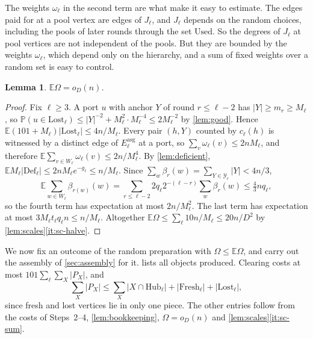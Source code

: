 \documentclass[11pt]{article}
\newtheorem{lemma}[theorem]{Lemma}
\theoremstyle{definition}
\theoremstyle{remark}
\numberwithin{equation}{section}
\numberwithin{figure}{section}
\numberwithin{table}{section}
\newcommand{\E}{\mathbb{E}}
\renewcommand{\Pr}{\mathbb{P}}
\newcommand{\cY}{\mathcal{Y}}
\newcommand{\Hub}{\mathrm{Hub}}
\newcommand{\Fresh}{\mathrm{Fresh}}
\newcommand{\Lost}{\mathrm{Lost}}
\newcommand{\Def}{\mathrm{Def}}
\newcommand{\Used}{\mathrm{Used}}
\newcommand{\Eas}{E^{\mathrm{asg}}}
\newcommand{\oD}{o_D(n)}
\begin{document}
The weights $\omega_\ell$ in the second term are what make it easy to
estimate. The edges paid for at a pool vertex are edges of $J_\ell$, and
$J_\ell$ depends on the random choices, including the pools of later rounds
through the set $\Used$. So the degrees of $J_\ell$ at pool vertices are not
independent of the pools. But they are bounded by the weights $\omega_\ell$,
which depend only on the hierarchy, and a sum of fixed weights over a random
set is easy to control.

\begin{lemma}\label{lem:Omega}
$\E\Omega=\oD$.
\end{lemma}

\begin{proof}
Fix $\ell\ge3$. A port $u$ with anchor $Y$ of round $r\le\ell-2$ has
$|Y|\ge m_r\ge M_\ell$, so $\Pr(u\in\Lost_\ell)\le|Y|^{-2}+M_\ell^2\cdot
M_\ell^{-4}\le2M_\ell^{-2}$ by \cref{lem:good}. Hence
$\E(101+M_\ell)|\Lost_\ell|\le4n/M_\ell$. Every pair $(h,Y)$ counted by
$c_\ell(h)$ is witnessed by a distinct edge of $\Eas_\ell$ at a port, so
$\sum_v\omega_\ell(v)\le2nM_\ell$, and therefore
$\E\sum_{v\in W_\ell}\omega_\ell(v)\le2n/M_\ell^4$. By \cref{lem:deficient},
$\E M_\ell|\Def_\ell|\le2nM_\ell e^{-g_\ell}\le n/M_\ell$. Since
$\sum_w\beta_r(w)=\sum_{Y\in\cY_r}|Y|<4n/3$,
\[
\E\sum_{w\in W_\ell}\beta_{r(w)}(w)=\sum_{r\le\ell-2}2q_\ell2^{-(\ell-r)}
\sum_w\beta_r(w)\le\tfrac43nq_\ell,
\]
so the fourth term has expectation at most $2n/M_\ell^2$. The last term has
expectation at most $3M_\ell t_\ell q_\ell n\le n/M_\ell$. Altogether
$\E\Omega\le\sum_\ell10n/M_\ell\le20n/D^2$ by
\cref{lem:scales}\ref{it:sc-halve}.
\end{proof}

We now fix an outcome of the random preparation with $\Omega\le\E\Omega$, and
carry out the assembly of \cref{sec:assembly} for it.  lists
all objects produced. Clearing costs at most $101\sum_\ell\sum_X|P_X|$, and
\[
\sum_X|P_X|\le\sum_X|X\cap\Hub_\ell|+|\Fresh_\ell|+|\Lost_\ell|,
\]
since fresh and lost vertices lie in only one piece. The other entries follow
from the costs of Steps~2--4, \cref{lem:bookkeeping}, $\Omega=\oD$ and
\cref{lem:scales}\ref{it:sc-sum}.
\end{document}
